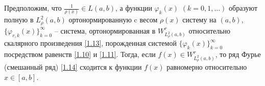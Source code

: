 \begin{theorem} Предположим, что  $ \frac{1}{\rho(x)}\in L(a,b) $, а  функции $\varphi_k(x)$ $(k=0,1,\ldots)$  образуют полную в $L^2_\rho(a,b)$ ортонормированную   c весом   $\rho(x)$ систему на $(a,b)$, $\{\varphi_{r,k}(x)\}_{k=0}^\infty$ -- система, ортонормированная в $W^r_{L^2_\rho(a,b)}$ относительно скалярного произведения \eqref{1.13},  порожденная системой $\{\varphi_{k}(x)\}_{k=0}^\infty$ посредством равенств \eqref{1.10} и \eqref{1.11}.
Тогда, если $f(x)\in W^r_{L^2_\rho(a,b)}$, то ряд Фурье (смешанный ряд) \eqref{1.14} сходится к функции $f(x)$ равномерно относительно $x\in[a,b]$.
 \end{theorem}
%

